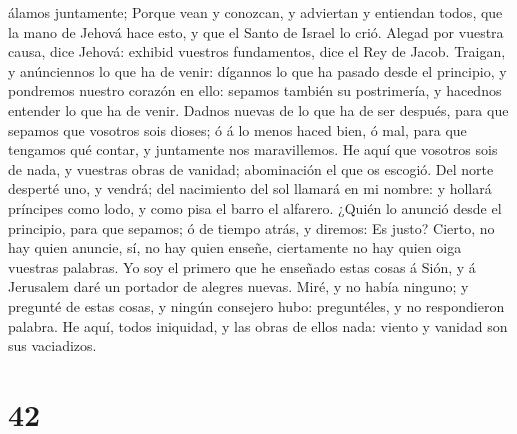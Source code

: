 álamos juntamente;  Porque vean y conozcan, y adviertan y
entiendan todos, que la mano de Jehová hace esto, y que el Santo de
Israel lo crió.  Alegad por vuestra causa, dice Jehová:
exhibid vuestros fundamentos, dice el Rey de Jacob. 
Traigan, y anúnciennos lo que ha de venir: dígannos lo que ha pasado
desde el principio, y pondremos nuestro corazón en ello: sepamos también
su postrimería, y hacednos entender lo que ha de venir. 
Dadnos nuevas de lo que ha de ser después, para que sepamos que vosotros
sois dioses; ó á lo menos haced bien, ó mal, para que tengamos qué
contar, y juntamente nos maravillemos.  He aquí que
vosotros sois de nada, y vuestras obras de vanidad; abominación el que
os escogió.  Del norte desperté uno, y vendrá; del
nacimiento del sol llamará en mi nombre: y hollará príncipes como lodo,
y como pisa el barro el alfarero.  ¿Quién lo anunció desde
el principio, para que sepamos; ó de tiempo atrás, y diremos: Es justo?
Cierto, no hay quien anuncie, sí, no hay quien enseñe, ciertamente no
hay quien oiga vuestras palabras.  Yo soy el primero que he
enseñado estas cosas á Sión, y á Jerusalem daré un portador de alegres
nuevas.  Miré, y no había ninguno; y pregunté de estas
cosas, y ningún consejero hubo: preguntéles, y no respondieron palabra.
 He aquí, todos iniquidad, y las obras de ellos nada:
viento y vanidad son sus vaciadizos.

\hypertarget{section-41}{%
\section{42}\label{section-41}}

